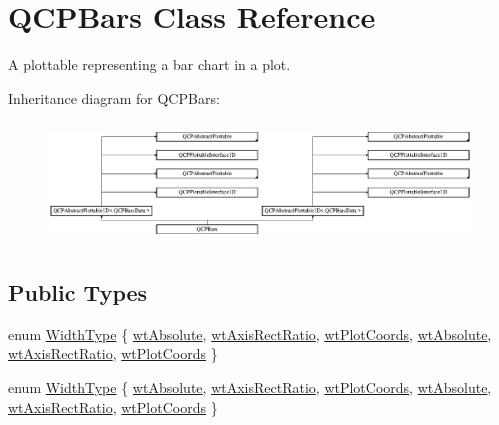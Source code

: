 \hypertarget{class_q_c_p_bars}{}\section{Q\+C\+P\+Bars Class Reference}
\label{class_q_c_p_bars}


A plottable representing a bar chart in a plot.  


Inheritance diagram for Q\+C\+P\+Bars\+:\begin{figure}[H]
\begin{center}
\leavevmode
\includegraphics[height=3.218391cm]{class_q_c_p_bars}
\end{center}
\end{figure}
\subsection*{Public Types}
\begin{DoxyCompactItemize}
\item 
enum \hyperlink{class_q_c_p_bars_a65dbbf1ab41cbe993d71521096ed4649}{Width\+Type} \{ \newline
\hyperlink{class_q_c_p_bars_a65dbbf1ab41cbe993d71521096ed4649ae7e741f0e184498ee3a94da6ac016541}{wt\+Absolute}, 
\hyperlink{class_q_c_p_bars_a65dbbf1ab41cbe993d71521096ed4649a904f41b3ee230356f50427dc929f8223}{wt\+Axis\+Rect\+Ratio}, 
\hyperlink{class_q_c_p_bars_a65dbbf1ab41cbe993d71521096ed4649a67f08c8d84085b506a42e7d85d14589a}{wt\+Plot\+Coords}, 
\hyperlink{class_q_c_p_bars_a65dbbf1ab41cbe993d71521096ed4649ae7e741f0e184498ee3a94da6ac016541}{wt\+Absolute}, 
\newline
\hyperlink{class_q_c_p_bars_a65dbbf1ab41cbe993d71521096ed4649a904f41b3ee230356f50427dc929f8223}{wt\+Axis\+Rect\+Ratio}, 
\hyperlink{class_q_c_p_bars_a65dbbf1ab41cbe993d71521096ed4649a67f08c8d84085b506a42e7d85d14589a}{wt\+Plot\+Coords}
 \}
\item 
enum \hyperlink{class_q_c_p_bars_a65dbbf1ab41cbe993d71521096ed4649}{Width\+Type} \{ \newline
\hyperlink{class_q_c_p_bars_a65dbbf1ab41cbe993d71521096ed4649ae7e741f0e184498ee3a94da6ac016541}{wt\+Absolute}, 
\hyperlink{class_q_c_p_bars_a65dbbf1ab41cbe993d71521096ed4649a904f41b3ee230356f50427dc929f8223}{wt\+Axis\+Rect\+Ratio}, 
\hyperlink{class_q_c_p_bars_a65dbbf1ab41cbe993d71521096ed4649a67f08c8d84085b506a42e7d85d14589a}{wt\+Plot\+Coords}, 
\hyperlink{class_q_c_p_bars_a65dbbf1ab41cbe993d71521096ed4649ae7e741f0e184498ee3a94da6ac016541}{wt\+Absolute}, 
\newline
\hyperlink{class_q_c_p_bars_a65dbbf1ab41cbe993d71521096ed4649a904f41b3ee230356f50427dc929f8223}{wt\+Axis\+Rect\+Ratio}, 
\hyperlink{class_q_c_p_bars_a65dbbf1ab41cbe993d71521096ed4649a67f08c8d84085b506a42e7d85d14589a}{wt\+Plot\+Coords}
 \}
\end{DoxyCompactItemize}
